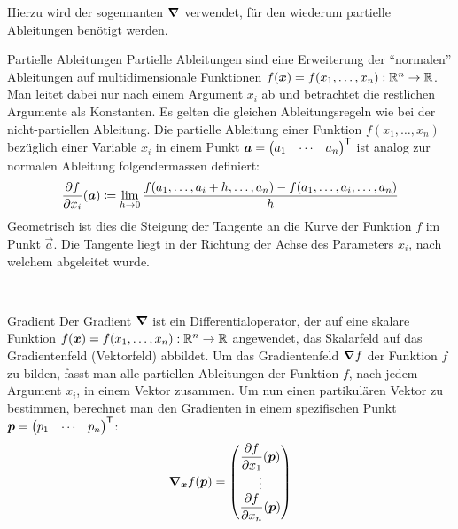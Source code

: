 \begin{appendices}
Hierzu wird der sogennanten  $\bm{\nabla}$ verwendet,
für den wiederum partielle Ableitungen benötigt werden.
\para{}
\begin{defbox}{Partielle Ableitungen}\label{ref:partielle_ableitungen}
  Partielle Ableitungen sind eine Erweiterung der ``normalen'' Ableitungen auf
  multidimensionale Funktionen $f(\bm{x}) = f(x_1,\ldots,x_n): \mathbb{R}^n \to \mathbb{R}$.
  Man leitet dabei nur nach einem Argument $x_i$ ab und betrachtet die restlichen Argumente als Konstanten.
  Es gelten die gleichen Ableitungsregeln wie bei der nicht-partiellen Ableitung.
  Die partielle Ableitung einer Funktion $f(x_1,\ldots,x_n)$ bezüglich einer
  Variable $x_i$ in einem Punkt $\bm{a} = \begin{pmatrix} a_1 & \cdots & a_n \end{pmatrix}^{\mathsf{T}}$
  ist analog zur normalen Ableitung folgendermassen definiert:
  \begin{equation*}
    \frac{\partial f}{\partial x_i}(\bm{a}) \coloneqq \lim_{h \to 0} \frac{f(a_1,\ldots,a_i + h,\ldots,a_n)-f(a_1,\ldots,a_i,\ldots,a_n)}{h}
  \end{equation*}
  Geometrisch ist dies die Steigung der Tangente an die Kurve der Funktion $f$ im Punkt
  $\vec{a}$. Die Tangente liegt in der Richtung der Achse des Parameters $x_i$,
  nach welchem abgeleitet wurde.
\end{defbox}
\\
\begin{defbox}{Gradient}
  Der Gradient $\bm{\nabla}$ ist ein Differentialoperator, der auf eine
  skalare Funktion $f(\bm{x}) = f(x_1,\ldots,x_n): \mathbb{R}^n \to \mathbb{R}$
  angewendet, das Skalarfeld auf das Gradientenfeld (Vektorfeld) abbildet.
  Um das Gradientenfeld $\bm{\nabla}f$ der Funktion $f$ zu bilden, fasst man alle
  partiellen Ableitungen der Funktion $f$, nach jedem Argument $x_i$, in einem
  Vektor zusammen.
  Um nun einen partikulären Vektor zu bestimmen, berechnet man den Gradienten in einem spezifischen Punkt
  $\bm{p} = \begin{pmatrix} p_1 & \cdots & p_n \end{pmatrix}^{\mathsf{T}}$:
  \begin{equation*}
    \bm{\nabla}_{\bm{x}} f(\bm{p}) =
    \begin{pmatrix}
      \displaystyle\frac{\partial f}{\partial x_1}(\bm{p}) \\
      \vdots \\
      \displaystyle\frac{\partial f}{\partial x_n}(\bm{p}) \\
    \end{pmatrix}
  \end{equation*}


\end{defbox}
\end{appendices}
